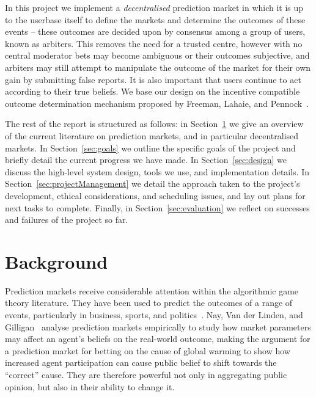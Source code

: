 \documentclass[10pt,a4paper]{article}
\theoremstyle{plain}
\theoremstyle{definition}
\begin{document}
In this project we implement a \emph{decentralised} prediction market in which
it is up to the userbase itself to define the markets and determine the
outcomes of these events -- these outcomes are decided upon by consensus among
a group of users, known as arbiters. This removes the need for a trusted
centre, however with no central moderator bets may become ambiguous or their
outcomes subjective, and arbiters may still attempt to manipulate the outcome
of the market for their own gain by submitting false reports. It is also
important that users continue to act according to their true beliefs. We base
our design on the incentive compatible outcome determination mechanism proposed
by Freeman, Lahaie, and Pennock~\cite{CODiPM}.

The rest of the report is structured as follows: in
Section~\ref{sec:background} we give an overview of the current literature on
prediction markets, and in particular decentralised markets. In
Section~\ref{sec:goals} we outline the specific goals of the project and
briefly detail the current progress we have made. In Section~\ref{sec:design}
we discuss the high-level system design, tools we use, and implementation
details. In Section~\ref{sec:projectManagement} we detail the approach taken to
the project's development, ethical considerations, and scheduling issues, and
lay out plans for next tasks to complete. Finally, in
Section~\ref{sec:evaluation} we reflect on successes and failures of the
project so far.

\section{Background}

\label{sec:background}

Prediction markets receive considerable attention within the algorithmic game
theory literature. They have been used to predict the outcomes of a range of
events, particularly in business, sports, and politics~\cite{Spann2003,
Berg2006}. Nay, Van der Linden, and Gilligan~\cite{Nay2016} analyse prediction
markets empirically to study how market parameters may affect an agent's
beliefs on the real-world outcome, making the argument for a prediction market
for betting on the cause of global warming to show how increased agent
participation can cause public belief to shift towards the ``correct'' cause.
They are therefore powerful not only in aggregating public opinion, but also in
their ability to change it.
\end{document}
